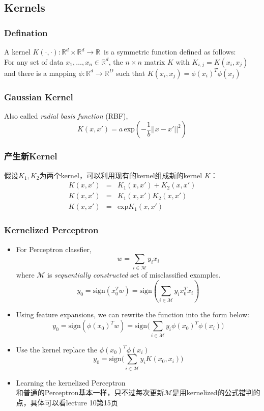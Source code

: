 \documentclass{article} 	%
\begin{document}
	\subsection{Kernels}
		\subsubsection{Defination}
			A kernel $K(\cdot,\cdot):\mathbb{R}^d\times \mathbb{R}^d \to \mathbb{R}$\ is a symmetric function defined as follows:\\
			For any set of data $x_1,\ldots, x_n \in \mathbb{R}^d$, the $n \times n$ matrix $K$ with $K_{i,j} = K(x_i,x_j)$ and there is a mapping 
			$\phi:\mathbb{R}^d \to \mathbb{R}^D$ such that $K(x_i,x_j) = \phi(x_i)^T\phi(x_j)$
		\subsubsection{Gaussian Kernel}
			Also called \emph{radial basis function} (RBF),
			$$K(x,x') = a\,\mathrm{exp}(-\frac{1}{b}||x-x'||^2)$$
		\subsubsection{产生新Kernel}
			假设$K_1,K_2$为两个kernel，可以利用现有的kernel组成新的kernel $K$：
			\begin{eqnarray}
			K(x,x') &=& K_1(x,x') + K_2(x,x')\\
			K(x,x') &=& K_1(x,x')K_2(x,x')\\
			K(x,x') &=& \mathrm{exp}{K_1(x,x')} 
			\end{eqnarray}
		\subsubsection{Kernelized Perceptron}
			\begin{itemize}
			\item
			For Perceptron classfier,
			$$w = \sum_{i \in \mathcal{M}}y_ix_i$$
			where $\mathcal{M}$ is \emph{sequentially constructed} set of misclassified examples.
			$$y_0 =\mathrm{sign}(x_0^Tw) = \mathrm{sign}(\sum_{i \in \mathcal{M}}y_ix_0^T x_i)$$
			\item
			Using feature expansions, we can rewrite the function into the form below:
			$$y_0 =\mathrm{sign}(\phi(x_0)^Tw) = \mathrm{sign}\big (\sum_{i \in \mathcal{M}}y_i\phi(x_0)^T \phi(x_i)\big)$$
			\item
			Use the kernel replace the $\phi(x_0)^T \phi(x_i)$
			$$y_0 = \mathrm{sign}\big (\sum_{i \in \mathcal{M}}y_i K(x_0,x_i)\big)$$
			\item
			Learning the kernelized Perceptron\\
			和普通的Perceptron基本一样，只不过每次更新$\mathcal{M}$是用kernelized的公式错判的点，具体可以看lecture 10第15页
			\end{itemize}
\end{document}
